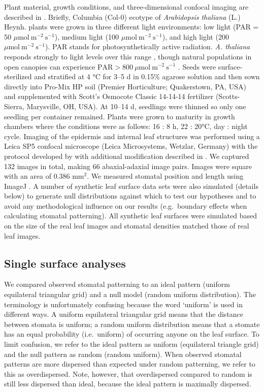 \documentclass[webpdf,large,modern,unnumsec,namedate]{oup-authoring-template}
\begin{document}
Plant material, growth conditions, and three-dimensional confocal
imaging are described in \citet{dow_disruption_2017}. Briefly, Columbia
(Col-0) ecotype of \emph{Arabidopsis thaliana} (L.) Heynh. plants were
grown in three different light environments: low light (PAR = 50
\(\mu \text{mol}~\text{m}^{-2}~\text{s}^{-1}\)), medium light (100
\(\mu \text{mol}~\text{m}^{-2}~\text{s}^{-1}\)), and high light (200
\(\mu \text{mol}~\text{m}^{-2}~\text{s}^{-1}\)). PAR stands for
photosynthetically active radiation. \emph{A. thaliana} responds
strongly to light levels over this range
\citep{bailey_acclimation_2001}, though natural populations in open
canopies can experience
\(\text{PAR} > 800~\mu \text{mol}~\text{m}^{-2}~\text{s}^{-1}\)
\citep{callahan_shade-induced_2002}. Seeds were surface-sterilized and
stratified at 4 °C for 3--5 d in 0.15\% agarose solution and then sown
directly into Pro-Mix HP soil (Premier Horticulture; Quakerstown, PA,
USA) and supplemented with Scott's Osmocote Classic 14-14-14 fertilizer
(Scotts-Sierra, Marysville, OH, USA). At 10--14 d, seedlings were
thinned so only one seedling per container remained. Plants were grown
to maturity in growth chambers where the conditions were as follows: 16
: 8 h, 22 : 20°C, day : night cycle. Imaging of the epidermis and
internal leaf structures was performed using a Leica SP5 confocal
microscope (Leica Microsystems, Wetzlar, Germany) with the protocol
developed by \citet{wuyts_high-contrast_2010} with additional
modification described in \citet{dow_disruption_2017}. We captured 132
images in total, making 66 abaxial-adaxial image pairs. Images were
square with an area of 0.386 mm\(^2\). We measured stomatal position and
length using ImageJ \citep{schneider_nih_2012}. A number of synthetic
leaf surface data sets were also simulated (details below) to generate
null distributions against which to test our hypotheses and to avoid any
methodological influence on our results (e.g.~boundary effects when
calculating stomatal patterning). All synthetic leaf surfaces were
simulated based on the size of the real leaf images and stomatal
densities matched those of real leaf images.

\subsection{Single surface analyses}\label{single-surface-analyses}

We compared observed stomatal patterning to an ideal pattern (uniform
equilateral triangular grid) and a null model (random uniform
distribution). The terminology is unfortunately confusing because the
word `uniform' is used in different ways. A uniform equilateral
triangular grid means that the distance between stomata is uniform; a
random uniform distribution means that a stomate has an equal
probability (i.e.~uniform) of occurring anyone on the leaf surface. To
limit confusion, we refer to the ideal pattern as uniform (equilateral
triangle grid) and the null pattern as random (random uniform). When
observed stomatal patterns are more dispersed than expected under random
patterning, we refer to this as overdispersed. Note, however, that
overdispersed compared to random is still less dispersed than ideal,
because the ideal pattern is maximally dispersed.
\end{document}
